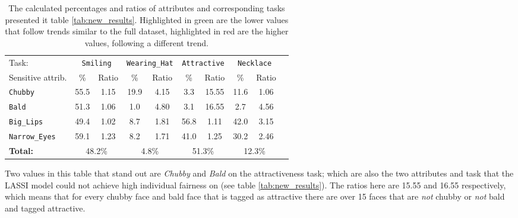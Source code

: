 \begin{table}[h]
\small
\centering
\begin{tabular}{lccccccccc}
\toprule
Task: & \multicolumn{2}{c}{\texttt{Smiling}} & \multicolumn{2}{c}{\texttt{Wearing\_Hat}} & \multicolumn{2}{c}{\texttt{Attractive}} & \multicolumn{2}{c}{\texttt{Necklace}} \\
Sensitive attrib. & \% & Ratio & \% & Ratio & \% & Ratio & \% & Ratio \\
\cmidrule(rl){1-1} \cmidrule(rl){2-3} \cmidrule(rl){4-5} \cmidrule(rl){6-7} \cmidrule(rl){8-9}
\texttt{Chubby} & 55.5 & \colorbox{mygreen}{1.15} & 19.9 & \colorbox{mygreen}{4.15} & 3.3 & \colorbox{myred}{15.55} & 11.6 & \colorbox{mygreen}{1.06} \\
\texttt{Bald} & 51.3 & \colorbox{mygreen}{1.06} & 1.0 & \colorbox{mygreen}{4.80} & 3.1 & \colorbox{myred}{16.55} & 2.7 & \colorbox{mygreen}{4.56} \\
\texttt{Big\_Lips} & 49.4 & \colorbox{mygreen}{1.02} & 8.7 & \colorbox{mygreen}{1.81} & 56.8 & \colorbox{mygreen}{1.11} & 42.0 & \colorbox{mygreen}{3.15} \\
\texttt{Narrow\_Eyes} & 59.1 & \colorbox{mygreen}{1.23} & 8.2 & \colorbox{mygreen}{1.71} & 41.0 & \colorbox{mygreen}{1.25} & 30.2 & \colorbox{mygreen}{2.46} \\
\cmidrule(rl){1-1} \cmidrule(rl){2-3} \cmidrule(rl){4-5} \cmidrule(rl){6-7} \cmidrule(rl){8-9}
\textbf{Total:} & \multicolumn{2}{c}{48.2\%} & \multicolumn{2}{c}{4.8\%} & \multicolumn{2}{c}{51.3\%} & \multicolumn{2}{c}{12.3\%} \\
\bottomrule
\end{tabular}
\caption{\label{tab:percentages} The calculated percentages and ratios of attributes and corresponding tasks presented it table \ref{tab:new_results}. Highlighted in green are the lower values that follow trends similar to the full dataset, highlighted in red are the higher values, following a different trend.}
\end{table}

Two values in this table that stand out are \textit{Chubby} and \textit{Bald} on the attractiveness task; which are also the two attributes and task that the LASSI model could not achieve high individual fairness on (see table \ref{tab:new_results}). The ratios here are 15.55 and 16.55 respectively, which means that for every chubby face and bald face that is tagged as attractive there are over 15 faces that are \textit{not} chubby or \textit{not} bald and tagged attractive. \newline

